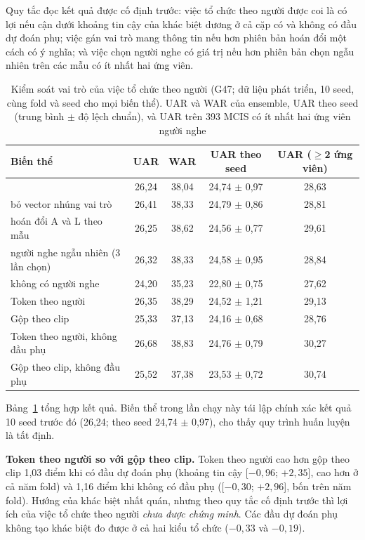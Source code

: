 Quy tắc đọc kết quả được cố định trước: việc tổ chức theo người được coi là có lợi nếu cận dưới khoảng tin cậy của khác biệt dương ở cả cặp có và không có đầu dự đoán phụ; việc gán vai trò mang thông tin nếu \model{} hơn phiên bản hoán đổi một cách có ý nghĩa; và việc chọn người nghe có giá trị nếu \model{} hơn phiên bản chọn ngẫu nhiên trên các mẫu có ít nhất hai ứng viên.

\begin{table}[!htb]
\centering
\caption{Kiểm soát vai trò của việc tổ chức theo người (G47; dữ liệu phát triển, 10 seed, cùng fold và seed cho mọi biến thể). UAR và WAR của ensemble, UAR theo seed (trung bình $\pm$ độ lệch chuẩn), và UAR trên 393 MCIS có ít nhất hai ứng viên người nghe}
\label{tab:g47}
{\fontsize{12}{14}\selectfont
\begin{tabular}{lcccc}
\toprule
Biến thể & UAR & WAR & UAR theo seed & UAR ($\ge$2 ứng viên) \\
\midrule
\model{} & 26,24 & 38,04 & 24,74 $\pm$ 0,97 & 28,63 \\
\quad bỏ vector nhúng vai trò & 26,41 & 38,33 & 24,79 $\pm$ 0,86 & 28,81 \\
\quad hoán đổi A và L theo mẫu & 26,25 & 38,62 & 24,56 $\pm$ 0,77 & 29,61 \\
\quad người nghe ngẫu nhiên (3 lần chọn) & 26,32 & 38,33 & 24,58 $\pm$ 0,95 & 28,84 \\
\quad không có người nghe & 24,20 & 35,23 & 22,80 $\pm$ 0,75 & 27,62 \\
\midrule
Token theo người & 26,35 & 38,29 & 24,52 $\pm$ 1,21 & 29,13 \\
Gộp theo clip & 25,33 & 37,13 & 24,16 $\pm$ 0,68 & 28,76 \\
Token theo người, không đầu phụ & 26,68 & 38,83 & 24,76 $\pm$ 0,79 & 30,27 \\
Gộp theo clip, không đầu phụ & 25,52 & 37,38 & 23,53 $\pm$ 0,72 & 30,74 \\
\bottomrule
\end{tabular}}
\end{table}

Bảng~\ref{tab:g47} tổng hợp kết quả. Biến thể \model{} trong lần chạy này tái lập chính xác kết quả 10 seed trước đó (26,24; theo seed 24,74 $\pm$ 0,97), cho thấy quy trình huấn luyện là tất định.

\textbf{Token theo người so với gộp theo clip.} Token theo người cao hơn gộp theo clip 1,03 điểm khi có đầu dự đoán phụ (khoảng tin cậy [$-0{,}96$; $+2{,}35$], cao hơn ở cả năm fold) và 1,16 điểm khi không có đầu phụ ([$-0{,}30$; $+2{,}96$], bốn trên năm fold). Hướng của khác biệt nhất quán, nhưng theo quy tắc cố định trước thì lợi ích của việc tổ chức theo người \emph{chưa được chứng minh}. Các đầu dự đoán phụ không tạo khác biệt đo được ở cả hai kiểu tổ chức ($-0{,}33$ và $-0{,}19$).


